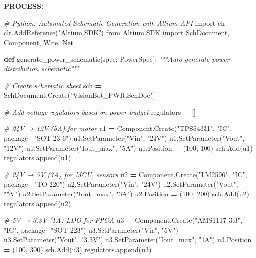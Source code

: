 \documentclass[
]{article}
\newenvironment{Shaded}{\begin{snugshade}}{\end{snugshade}}
\newcommand{\CommentTok}[1]{\textcolor[rgb]{0.56,0.35,0.01}{\textit{#1}}}
\newcommand{\DecValTok}[1]{\textcolor[rgb]{0.00,0.00,0.81}{#1}}
\newcommand{\ImportTok}[1]{#1}
\newcommand{\KeywordTok}[1]{\textcolor[rgb]{0.13,0.29,0.53}{\textbf{#1}}}
\newcommand{\NormalTok}[1]{#1}
\newcommand{\OperatorTok}[1]{\textcolor[rgb]{0.81,0.36,0.00}{\textbf{#1}}}
\newcommand{\StringTok}[1]{\textcolor[rgb]{0.31,0.60,0.02}{#1}}
\begin{document}
\textbf{PROCESS:}

\begin{Shaded}
\begin{Highlighting}[]
\CommentTok{\# Python: Automated Schematic Generation with Altium API}
\ImportTok{import}\NormalTok{ clr}
\NormalTok{clr.AddReference(}\StringTok{"Altium.SDK"}\NormalTok{)}
\ImportTok{from}\NormalTok{ Altium.SDK }\ImportTok{import}\NormalTok{ SchDocument, Component, Wire, Net}

\KeywordTok{def}\NormalTok{ generate\_power\_schematic(spec: PowerSpec):}
    \CommentTok{"""Auto{-}generate power distribution schematic"""}

    \CommentTok{\# Create schematic sheet}
\NormalTok{    sch }\OperatorTok{=}\NormalTok{ SchDocument.Create(}\StringTok{"VisionBot\_PWR.SchDoc"}\NormalTok{)}

    \CommentTok{\# Add voltage regulators based on power budget}
\NormalTok{    regulators }\OperatorTok{=}\NormalTok{ []}

    \CommentTok{\# 24V → 12V (5A) for motor}
\NormalTok{    u1 }\OperatorTok{=}\NormalTok{ Component.Create(}\StringTok{"TPS54331"}\NormalTok{, }\StringTok{"IC"}\NormalTok{, package}\OperatorTok{=}\StringTok{"SOT{-}23{-}6"}\NormalTok{)}
\NormalTok{    u1.SetParameter(}\StringTok{"Vin"}\NormalTok{, }\StringTok{"24V"}\NormalTok{)}
\NormalTok{    u1.SetParameter(}\StringTok{"Vout"}\NormalTok{, }\StringTok{"12V"}\NormalTok{)}
\NormalTok{    u1.SetParameter(}\StringTok{"Iout\_max"}\NormalTok{, }\StringTok{"5A"}\NormalTok{)}
\NormalTok{    u1.Position }\OperatorTok{=}\NormalTok{ (}\DecValTok{100}\NormalTok{, }\DecValTok{100}\NormalTok{)}
\NormalTok{    sch.Add(u1)}
\NormalTok{    regulators.append(u1)}

    \CommentTok{\# 24V → 5V (3A) for MCU, sensors}
\NormalTok{    u2 }\OperatorTok{=}\NormalTok{ Component.Create(}\StringTok{"LM2596"}\NormalTok{, }\StringTok{"IC"}\NormalTok{, package}\OperatorTok{=}\StringTok{"TO{-}220"}\NormalTok{)}
\NormalTok{    u2.SetParameter(}\StringTok{"Vin"}\NormalTok{, }\StringTok{"24V"}\NormalTok{)}
\NormalTok{    u2.SetParameter(}\StringTok{"Vout"}\NormalTok{, }\StringTok{"5V"}\NormalTok{)}
\NormalTok{    u2.SetParameter(}\StringTok{"Iout\_max"}\NormalTok{, }\StringTok{"3A"}\NormalTok{)}
\NormalTok{    u2.Position }\OperatorTok{=}\NormalTok{ (}\DecValTok{100}\NormalTok{, }\DecValTok{200}\NormalTok{)}
\NormalTok{    sch.Add(u2)}
\NormalTok{    regulators.append(u2)}

    \CommentTok{\# 5V → 3.3V (1A) LDO for FPGA}
\NormalTok{    u3 }\OperatorTok{=}\NormalTok{ Component.Create(}\StringTok{"AMS1117{-}3.3"}\NormalTok{, }\StringTok{"IC"}\NormalTok{, package}\OperatorTok{=}\StringTok{"SOT{-}223"}\NormalTok{)}
\NormalTok{    u3.SetParameter(}\StringTok{"Vin"}\NormalTok{, }\StringTok{"5V"}\NormalTok{)}
\NormalTok{    u3.SetParameter(}\StringTok{"Vout"}\NormalTok{, }\StringTok{"3.3V"}\NormalTok{)}
\NormalTok{    u3.SetParameter(}\StringTok{"Iout\_max"}\NormalTok{, }\StringTok{"1A"}\NormalTok{)}
\NormalTok{    u3.Position }\OperatorTok{=}\NormalTok{ (}\DecValTok{100}\NormalTok{, }\DecValTok{300}\NormalTok{)}
\NormalTok{    sch.Add(u3)}
\NormalTok{    regulators.append(u3)}


\end{Highlighting}
\end{Shaded}
\end{document}
